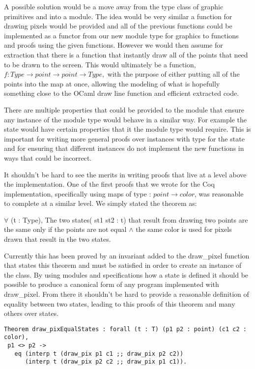 \documentclass{llncs}
\begin{document}
A possible solution would be a move away from the type class of graphic primitives and into a module.  The idea would be very similar a function for drawing pixels would be provided and all of the previous functions could be implemented as a functor from our new module type for graphics to functions and proofs using the given functions.  However we would then assume for extraction that there is a function that instantly draw all of the points that need to be drawn to the screen.  This would ultimately be a function, $f :Type \rightarrow point \rightarrow point \rightarrow Type,$ with the purpose of either putting all of the points into the map at once, allowing the modeling of what is hopefully something close to the OCaml draw line function and efficient extracted code.

There are multiple properties that could be provided to the module that ensure any instance of the module type would behave in a similar way.  For example the state would have certain properties that it the module type would require.  This is important for writing more general proofs over instances with type for the state and for ensuring that different instances do not implement the new functions in ways that could be incorrect.

It shouldn't be hard to see the merits in writing proofs that live at a level above the implementation.  One of the first proofs that we wrote for the Coq implementation, specifically using maps of type : $point \rightarrow color$, was reasonable to complete at a similar level.  We simply stated the theorem as:
\begin{theorem}
  $\forall$ (t : Type), The two states( st1 st2 : t) that result from drawing two points are the same only if the points are not equal $\land$ the same color is used for pixels drawn that result in the two states.
\end{theorem}

Currently this has been proved by an invariant added to the draw\_pixel function that states this theorem and must be satisfied in order to create an instance of the class.  By using modules and specifications how a state is defined it should be possible to produce a canonical form of any program implemented with draw\_pixel.  From there it shouldn't be hard to provide a reasonable definition of equality between two states, leading to this proofs of this theorem and many others over states.

\begin{lstlisting}
Theorem draw_pixEqualStates : forall (t : T) (p1 p2 : point) (c1 c2 : color),
 p1 <> p2 -> 
   eq (interp t (draw_pix p1 c1 ;; draw_pix p2 c2))
      (interp t (draw_pix p2 c2 ;; draw_pix p1 c1)).
\end{lstlisting}
\end{document}
